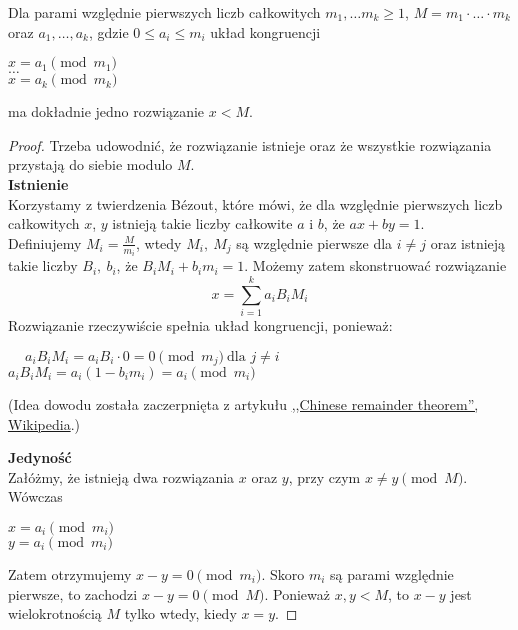 \begin{theorem}
    Dla parami względnie pierwszych liczb całkowitych \( m_1, \dots m_k \geq 1 \), \( M = m_1 \cdot \ldots \cdot m_k \) oraz \( a_1, \ldots, a_k \), gdzie \( 0 \leq a_i \leq m_i \) układ kongruencji
    \begin{center}
        \( x = a_1 \pmod{m_1} \) \\
        \( \dots \) \\
        \( x = a_k \pmod{m_k} \)
    \end{center}
    ma dokładnie jedno rozwiązanie \( x < M \).
\end{theorem}
\begin{proof}
    Trzeba udowodnić, że rozwiązanie istnieje oraz że wszystkie rozwiązania przystają do siebie modulo \( M \). \\
    \textbf{Istnienie} \\
    Korzystamy z twierdzenia B\'ezout, które mówi, że dla względnie pierwszych liczb całkowitych \( x \), \( y \) istnieją takie liczby całkowite \( a \) i \( b \), że \( ax + by = 1 \). \\
    Definiujemy \( M_i = \frac{M}{m_i} \), wtedy \( M_i, \ M_j \) są względnie pierwsze dla \( i \neq j \) oraz istnieją takie liczby \( B_i, \ b_i \), że \( B_iM_i + b_im_i = 1 \). Możemy zatem skonstruować rozwiązanie
    \[
        x = \sum_{i=1}^{k} a_iB_iM_i
    \]
    Rozwiązanie rzeczywiście spełnia układ kongruencji, ponieważ:
    \begin{center}
        \( \quad \ a_iB_iM_i = a_iB_i \cdot 0 = 0 \pmod{m_j} \ \text{dla } j \neq i\) \\
        \( a_iB_iM_i = a_i(1 - b_im_i) = a_i \pmod{m_i} \) \\
    \end{center}
    (Idea dowodu została zaczerpnięta z artykułu \href{https://en.wikipedia.org/wiki/Chinese_remainder_theorem#Proof}{,,Chinese remainder theorem'', Wikipedia}.)

    \textbf{Jedyność} \\
    Załóżmy, że istnieją dwa rozwiązania \( x \) oraz \( y \), przy czym \( x \neq y \pmod{M} \). Wówczas
    \begin{center}
        \( x = a_i \pmod{m_i} \) \\
        \( y = a_i \pmod{m_i} \)
    \end{center}
    Zatem otrzymujemy \( x-y = 0 \pmod{m_i} \). Skoro \( m_i \) są parami względnie pierwsze, to zachodzi \(  x-y = 0 \pmod{M} \). Ponieważ \( x, y < M \), to \( x-y \) jest wielokrotnością \( M \) tylko wtedy, kiedy \( x = y \).
\end{proof}
